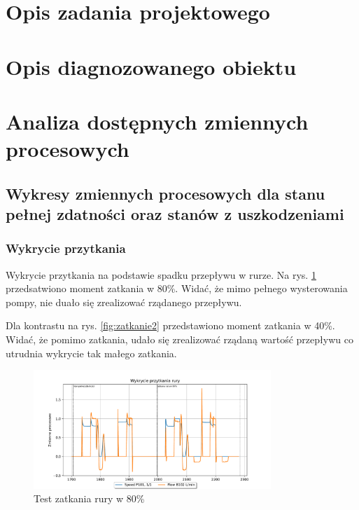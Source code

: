 \documentclass[a4paper,12pt]{article}
\begin{document}



\section{Opis zadania projektowego}

\section{Opis diagnozowanego obiektu}


\section{Analiza dostępnych zmiennych procesowych}


\subsection{Wykresy zmiennych procesowych dla stanu pełnej zdatności oraz stanów z uszkodzeniami}

\subsubsection{Wykrycie przytkania}

Wykrycie przytkania na podstawie spadku przepływu w rurze. Na rys. \ref{fig:zatkanie1} przedsatwiono moment zatkania w 80\%. Widać, że mimo pełnego wysterowania pompy, nie duało się zrealizować rządanego przepływu.

Dla kontrastu na rys. \ref{fig:zatkanie2} przedstawiono moment zatkania w 40\%. Widać, że pomimo zatkania, udało się zrealizować rządaną wartość przepływu co utrudnia wykrycie tak małego zatkania.

\begin{figure}[H]
        \centering
        \includegraphics[width=0.8\textwidth]{clogging_detection_1700_2280.pdf}
        \caption{Test zatkania rury w 80\%}
        \label{fig:zatkanie1}
\end{figure}
\end{document}
